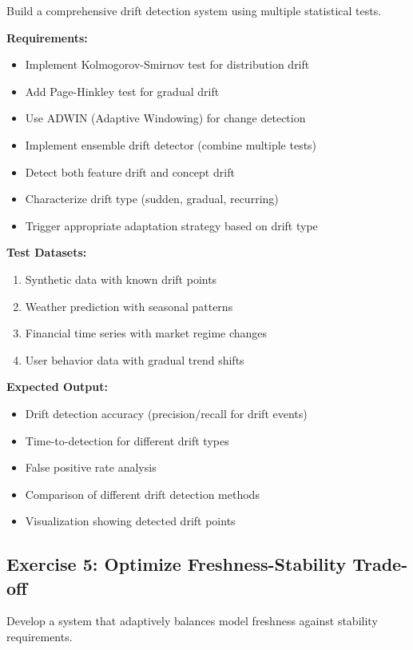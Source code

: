 Build a comprehensive drift detection system using multiple statistical tests.

\textbf{Requirements:}
\begin{itemize}
    \item Implement Kolmogorov-Smirnov test for distribution drift
    \item Add Page-Hinkley test for gradual drift
    \item Use ADWIN (Adaptive Windowing) for change detection
    \item Implement ensemble drift detector (combine multiple tests)
    \item Detect both feature drift and concept drift
    \item Characterize drift type (sudden, gradual, recurring)
    \item Trigger appropriate adaptation strategy based on drift type
\end{itemize}

\textbf{Test Datasets:}
\begin{enumerate}
    \item Synthetic data with known drift points
    \item Weather prediction with seasonal patterns
    \item Financial time series with market regime changes
    \item User behavior data with gradual trend shifts
\end{enumerate}

\textbf{Expected Output:}
\begin{itemize}
    \item Drift detection accuracy (precision/recall for drift events)
    \item Time-to-detection for different drift types
    \item False positive rate analysis
    \item Comparison of different drift detection methods
    \item Visualization showing detected drift points
\end{itemize}

\subsection{Exercise 5: Optimize Freshness-Stability Trade-off}

Develop a system that adaptively balances model freshness against stability requirements.

